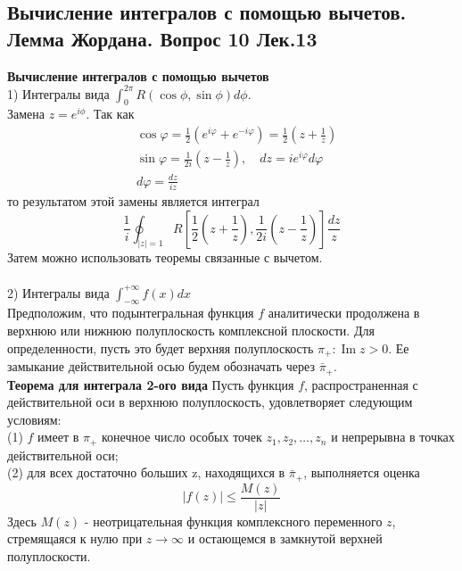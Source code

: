 \documentclass{article}
\begin{document}
\subsection{Вычисление интегралов с помощью вычетов. Лемма Жордана. Вопрос 10 Лек.13}
	\textbf{Вычисление интегралов с помощью вычетов}\\
	1) Интегралы вида $\int_{0}^{2\pi}R(\cos \phi,\sin \phi)d\phi$.\\
	Замена $z={e}^{i\phi}$. Так как
	\begin{equation}
	\begin{aligned}
		&\cos \varphi=\frac{1}{2}\left(e^{i \varphi}+e^{-i \varphi}\right)=\frac{1}{2}\left(z+\frac{1}{z}\right) \\
		&\sin \varphi=\frac{1}{2 i}\left(z-\frac{1}{z}\right), \quad d z=i e^{i \varphi} d \varphi\\
		&d \varphi=\frac{d z}{i z}
	\end{aligned}
	\end{equation}
	то результатом этой замены является интеграл
	\begin{equation}
	\frac{1}{i} \oint_{|z|=1} R\left[\frac{1}{2}\left(z+\frac{1}{z}\right), \frac{1}{2 i}\left(z-\frac{1}{z}\right)\right] \frac{d z}{z}
	\end{equation}
	Затем можно использовать теоремы связанные с вычетом.\\
	\\
	2) Интегралы вида $\int_{-\infty}^{+\infty} f(x)dx$\\
	Предположим, что подынтегральная функция $ f $ аналитически продолжена в верхнюю или нижнюю полуплоскость комплексной плоскости. Для определенности, пусть это будет верхняя полуплоскость $ \pi_{+}: \operatorname{Im} z>0 $. Ее замыкание действительной осью будем обозначать через $ \bar{\pi}_{+}$.\\
	\textbf{Теорема для интеграла 2-ого вида} Пусть функция $ f$, распространенная с действительной оси в верхнюю полуплоскость, удовлетворяет следующим условиям:\\
	(1) $ f $ имеет в $ \pi_{+} $ конечное число особых точек $ z_{1}, z_{2}, \ldots, z_{n} $ и непрерывна в точках действительной оси;\\
	(2) для всех достаточно больших z, находящихся в $ \bar{\pi}_{+}$, выполняется оценка
	\begin{equation}
	|f(z)| \leqslant \frac{M(z)}{|z|}
	\end{equation}
	Здесь $ M(z)$ - неотрицательная функция комплексного переменного $z$, стремящаяся к нулю при $ z \rightarrow \infty $ и остающемся в замкнутой верхней полуплоскости.\\
\end{document}
